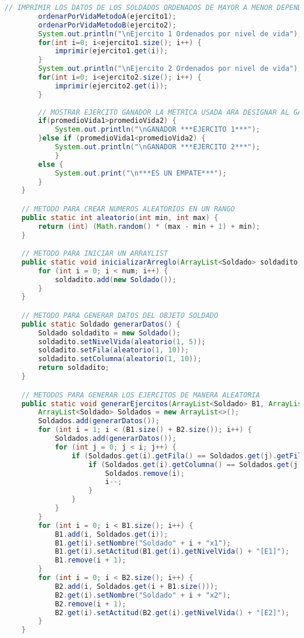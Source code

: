 \documentclass{article}
\begin{document}
\begin{itemize}
\begin{lstlisting}[language=java]
		// IMPRIMIR LOS DATOS DE LOS SOLDADOS ORDENADOS DE MAYOR A MENOR DEPENDIENDO DE SU NIVEL DE VIDA USANDO DOS TIPOS DE ALGORITMO
		ordenarPorVidaMetodoA(ejercito1);
		ordenarPorVidaMetodoB(ejercito2);
		System.out.println("\nEjercito 1 Ordenados por nivel de vida");
		for(int i=0; i<ejercito1.size(); i++) {
			imprimir(ejercito1.get(i));
		}
		System.out.println("\nEjercito 2 Ordenados por nivel de vida");
		for(int i=0; i<ejercito2.size(); i++) {
			imprimir(ejercito2.get(i));
		}
		
		// MOSTRAR EJERCITO GANADOR LA METRICA USADA ARA DESIGNAR AL GANADOR ES POR EL NIVEL DEL PROMEDIO DE VIDA DE CADA EJERCITO
		if(promedioVida1>promedioVida2) {
			System.out.println("\nGANADOR ***EJERCITO 1***");
		}else if (promedioVida1<promedioVida2) {
			System.out.println("\nGANADOR ***EJERCITO 2***");
			}
		else {
			System.out.print("\n***ES UN EMPATE***");
		}
	}

    // METODO PARA CREAR NUMEROS ALEATORIOS EN UN RANGO
    public static int aleatorio(int min, int max) {
        return (int) (Math.random() * (max - min + 1) + min);
    }

    // METODO PARA INICIAR UN ARRAYLIST
    public static void inicializarArreglo(ArrayList<Soldado> soldadito, int num) {
        for (int i = 0; i < num; i++) {
            soldadito.add(new Soldado());
        }
    }

    // METODO PARA GENERAR DATOS DEL OBJETO SOLDADO
    public static Soldado generarDatos() {
        Soldado soldadito = new Soldado();
        soldadito.setNivelVida(aleatorio(1, 5));
        soldadito.setFila(aleatorio(1, 10));
        soldadito.setColumna(aleatorio(1, 10));
        return soldadito;
    }

    // METODOS PARA GENERAR LOS EJERCITOS DE MANERA ALEATORIA
    public static void generarEjercitos(ArrayList<Soldado> B1, ArrayList<Soldado> B2) {
        ArrayList<Soldado> Soldados = new ArrayList<>();
        Soldados.add(generarDatos());
        for (int i = 1; i < (B1.size() + B2.size()); i++) {
            Soldados.add(generarDatos());
            for (int j = 0; j < i; j++) {
                if (Soldados.get(i).getFila() == Soldados.get(j).getFila()) {
                    if (Soldados.get(i).getColumna() == Soldados.get(j).getColumna()) {
                        Soldados.remove(i);
                        i--;
                    }
                }
            }
        }
        for (int i = 0; i < B1.size(); i++) {
            B1.add(i, Soldados.get(i));
            B1.get(i).setNombre("Soldado" + i + "x1");
            B1.get(i).setActitud(B1.get(i).getNivelVida() + "[E1]");
            B1.remove(i + 1);
        }
        for (int i = 0; i < B2.size(); i++) {
            B2.add(i, Soldados.get(i + B1.size()));
            B2.get(i).setNombre("Soldado" + i + "x2");
            B2.remove(i + 1);
            B2.get(i).setActitud(B2.get(i).getNivelVida() + "[E2]");
        }
    }


\end{lstlisting}
\end{itemize}
\end{document}
